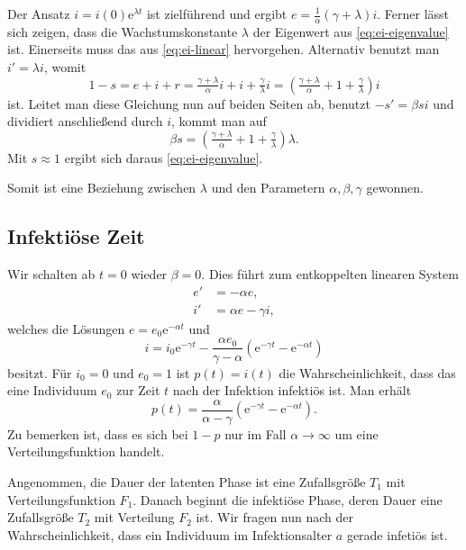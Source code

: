 \documentclass[a4paper,10pt,fleqn,twocolumn,twoside,dvipdfmx]{scrartcl}
\numberwithin{equation}{section}
\newcommand{\ee}{\mathrm e}
\begin{document}
Der Ansatz $i=i(0)\ee^{\lambda t}$ ist zielführend und
ergibt $e=\tfrac{1}{\alpha}(\gamma+\lambda)i$. Ferner lässt sich
zeigen, dass die Wachstumskonstante $\lambda$ der Eigenwert
aus \eqref{eq:ei-eigenvalue} ist. Einerseits muss das aus
\eqref{eq:ei-linear} hervorgehen. Alternativ benutzt man $i'=\lambda i$,
womit %
\[1-s = e + i + r
= \tfrac{\gamma+\lambda}{\alpha}i + i + \tfrac{\gamma}{\lambda} i
= (\tfrac{\gamma+\lambda}{\alpha} + 1 + \tfrac{\gamma}{\lambda})i\]
ist. Leitet man diese Gleichung nun auf beiden Seiten ab,
benutzt $-s' = \beta si$ und dividiert anschließend durch $i$,
kommt man auf%
\begin{equation}
\beta s = (\tfrac{\gamma+\lambda}{\alpha} + 1 + \tfrac{\gamma}{\lambda})\lambda.
\end{equation}
Mit $s\approx 1$ ergibt sich daraus \eqref{eq:ei-eigenvalue}.

Somit ist eine Beziehung zwischen $\lambda$ und den Parametern
$\alpha,\beta,\gamma$ gewonnen.

\subsection{Infektiöse Zeit}

Wir schalten ab $t=0$ wieder $\beta=0$. Dies führt zum
entkoppelten linearen System
\begin{align}
e' &= -\alpha e,\\
i' &= \alpha e-\gamma i,
\end{align}
welches die Lösungen $e = e_0\ee^{-\alpha t}$ und
\begin{equation}\label{eq:ei-prob-ode}
i = i_0\ee^{-\gamma t} - \frac{\alpha e_0}{\gamma-\alpha}(\ee^{-\gamma t}-\ee^{-\alpha t})
\end{equation}
besitzt. Für $i_0=0$ und $e_0=1$ ist $p(t)=i(t)$
die Wahrscheinlichkeit, dass das eine Individuum $e_0$ zur Zeit $t$
nach der Infektion infektiös ist. Man erhält
\begin{equation}\label{eq:seir-p}
p(t) = \frac{\alpha}{\alpha-\gamma}(\ee^{-\gamma t}-\ee^{-\alpha t}).
\end{equation}
Zu bemerken ist, dass es sich bei $1-p$ nur im Fall $\alpha\to\infty$
um eine Verteilungsfunktion handelt.

Angenommen, die Dauer der latenten Phase ist eine Zufallsgröße
$T_1$ mit Verteilungsfunktion $F_1$. Danach beginnt die infektiöse
Phase, deren Dauer eine Zufallsgröße $T_2$ mit Verteilung $F_2$ ist.
Wir fragen nun nach der Wahrscheinlichkeit, dass ein Individuum
im Infektionsalter $a$ gerade infetiös ist.
\end{document}
